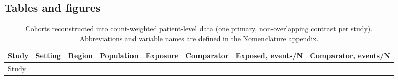 \documentclass[
  11pt,
]{article}
\begin{document}
\subsection{Tables and figures}\label{tables-and-figures}

\begin{longtable}[]{@{}
  >{\raggedright\arraybackslash}p{}
  >{\raggedright\arraybackslash}p{}
  >{\raggedright\arraybackslash}p{}
  >{\raggedright\arraybackslash}p{}
  >{\raggedright\arraybackslash}p{}
  >{\raggedright\arraybackslash}p{}
  >{\raggedright\arraybackslash}p{}
  >{\raggedright\arraybackslash}p{}@{}}
\caption{Cohorts reconstructed into count-weighted patient-level data
(one primary, non-overlapping contrast per study). Abbreviations and
variable names are defined in the Nomenclature appendix.}\tabularnewline
\toprule\noalign{}
\begin{minipage}[b]{\linewidth}\raggedright
Study
\end{minipage} & \begin{minipage}[b]{\linewidth}\raggedright
Setting
\end{minipage} & \begin{minipage}[b]{\linewidth}\raggedright
Region
\end{minipage} & \begin{minipage}[b]{\linewidth}\raggedright
Population
\end{minipage} & \begin{minipage}[b]{\linewidth}\raggedright
Exposure
\end{minipage} & \begin{minipage}[b]{\linewidth}\raggedright
Comparator
\end{minipage} & \begin{minipage}[b]{\linewidth}\raggedright
Exposed, events/N
\end{minipage} & \begin{minipage}[b]{\linewidth}\raggedright
Comparator, events/N
\end{minipage} \\
\midrule\noalign{}
\endfirsthead
\toprule\noalign{}
\begin{minipage}[b]{\linewidth}\raggedright
Study
\end{minipage} & \begin{minipage}[b]{\linewidth}\raggedright

\end{minipage}
\end{longtable}
\end{document}
